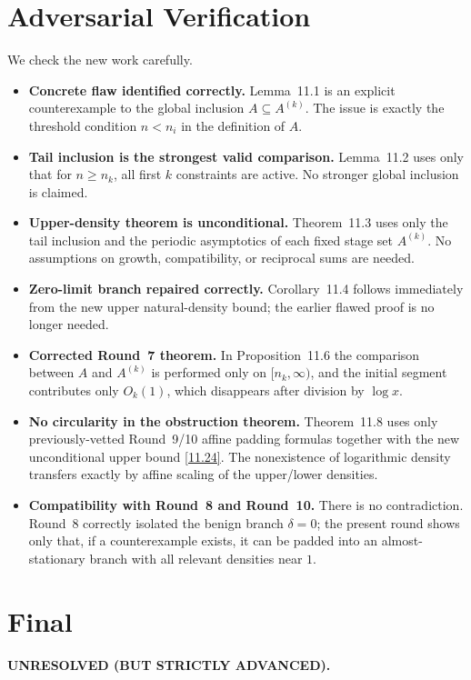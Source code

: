 \section{Adversarial Verification}
We check the new work carefully.
\begin{itemize}
\item \textbf{Concrete flaw identified correctly.}  Lemma~11.1 is an explicit counterexample to the global inclusion $A\subseteq A^{(k)}$.  The issue is exactly the threshold condition $n<n_i$ in the definition of $A$.

\item \textbf{Tail inclusion is the strongest valid comparison.}  Lemma~11.2 uses only that for $n\ge n_k$, all first $k$ constraints are active.  No stronger global inclusion is claimed.

\item \textbf{Upper-density theorem is unconditional.}  Theorem~11.3 uses only the tail inclusion and the periodic asymptotics of each fixed stage set $A^{(k)}$.  No assumptions on growth, compatibility, or reciprocal sums are needed.

\item \textbf{Zero-limit branch repaired correctly.}  Corollary~11.4 follows immediately from the new upper natural-density bound; the earlier flawed proof is no longer needed.

\item \textbf{Corrected Round~7 theorem.}  In Proposition~11.6 the comparison between $A$ and $A^{(k)}$ is performed only on $[n_k,\infty)$, and the initial segment contributes only $O_k(1)$, which disappears after division by $\log x$.

\item \textbf{No circularity in the obstruction theorem.}  Theorem~11.8 uses only previously-vetted Round~9/10 affine padding formulas together with the new unconditional upper bound \eqref{11.24}.  The nonexistence of logarithmic density transfers exactly by affine scaling of the upper/lower densities.

\item \textbf{Compatibility with Round~8 and Round~10.}  There is no contradiction.  Round~8 correctly isolated the benign branch $\delta=0$; the present round shows only that, if a counterexample exists, it can be padded into an almost-stationary branch with all relevant densities near $1$.
\end{itemize}

\section{Final}
\textbf{UNRESOLVED (BUT STRICTLY ADVANCED).}

